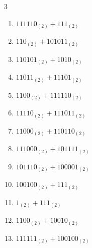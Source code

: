 \begin{multicols}{3}
\begin{enumerate}
  \item $111110_{(2)} + 111_{(2)}$


  \item $110_{(2)} + 101011_{(2)}$


  \item $110101_{(2)} + 1010_{(2)}$


  \item $11011_{(2)} + 11101_{(2)}$


  \item $1100_{(2)} + 111110_{(2)}$


  \item $11110_{(2)} + 111011_{(2)}$


\columnbreak %

\resetques

  \item $11000_{(2)} + 110110_{(2)}$


  \item $111000_{(2)} + 101111_{(2)}$


  \item $101110_{(2)} + 100001_{(2)}$


  \item $100100_{(2)} + 111_{(2)}$


  \item $1_{(2)} + 111_{(2)}$


  \item $1100_{(2)} + 10010_{(2)}$


  \item $111111_{(2)} + 100100_{(2)}$



\end{enumerate}
\end{multicols}
